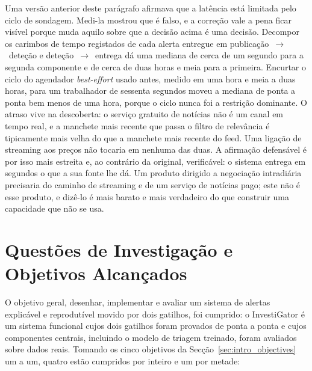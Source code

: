 Uma versão anterior deste parágrafo afirmava que a latência está limitada pelo ciclo de sondagem.
Medi-la mostrou que é falso, e a correção vale a pena ficar visível porque muda aquilo sobre que a
decisão acima é uma decisão. Decompor os carimbos de tempo registados de cada alerta entregue em
publicação~$\rightarrow$~deteção e deteção~$\rightarrow$~entrega dá uma mediana de cerca de um segundo
para a segunda componente e de cerca de duas horas e meia para a primeira. Encurtar o ciclo do
agendador \emph{best-effort} usado antes, medido em uma hora e meia a duas horas, para um trabalhador
de sessenta segundos moveu a mediana de ponta a ponta bem menos de uma hora, porque o ciclo nunca foi
a restrição dominante. O atraso vive na descoberta: o serviço gratuito de notícias não é um canal em
tempo real, e a manchete mais recente que passa o filtro de relevância é tipicamente mais velha do que
a manchete mais recente do feed. Uma ligação de streaming aos preços não tocaria em nenhuma das duas. A
afirmação defensável é por isso mais estreita e, ao contrário da original, verificável: o sistema
entrega em segundos o que a sua fonte lhe dá. Um produto dirigido a negociação intradiária precisaria
do caminho de streaming e de um serviço de notícias pago; este não é esse produto, e dizê-lo é mais
barato e mais verdadeiro do que construir uma capacidade que não se usa.

\section{Questões de Investigação e Objetivos Alcançados}
\label{sec:concl_objectives}

O objetivo geral, desenhar, implementar e avaliar um sistema de alertas explicável e reprodutível
movido por dois gatilhos, foi cumprido: o InvestiGator é um sistema funcional cujos dois gatilhos
foram provados de ponta a ponta e cujos componentes centrais, incluindo o modelo de triagem treinado,
foram avaliados sobre dados reais. Tomando os cinco objetivos da
Secção~\ref{sec:intro_objectives} um a um, quatro estão cumpridos por inteiro e um por metade:


